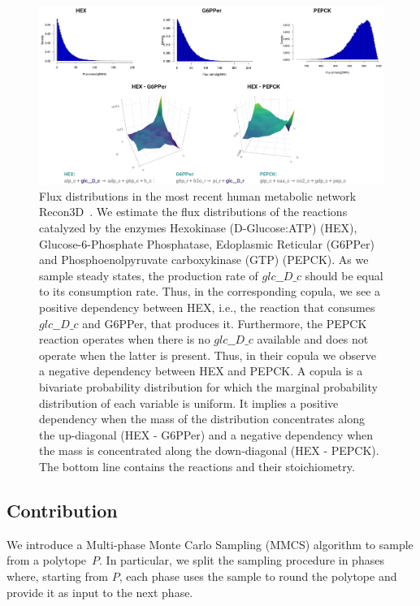    \begin{figure}[h]
      \centering
      \includegraphics[width=125mm]{figures/copulas_cropped.png}
      \caption[Flux distributions in the most recent human metabolic network Recon3D]{
         Flux distributions in the most recent human metabolic network Recon3D~\cite{brunk2018recon3d}. 
         We estimate the flux distributions of the reactions catalyzed by the enzymes Hexokinase (D-Glucose:ATP) (HEX), Glucose-6-Phosphate Phosphatase, Edoplasmic Reticular (G6PPer)
         and Phosphoenolpyruvate carboxykinase (GTP) (PEPCK).
         As we sample steady states, the production rate of $glc\_\_D \_c$ should be equal to its consumption rate. 
         Thus, in the corresponding copula, we see a positive dependency between HEX,
         i.e., the reaction that consumes $glc\_\_D \_c$ and G6PPer, that produces it.
         Furthermore, the PEPCK reaction operates when there is no $glc\_\_D\_c$ available and does not operate when the latter is present.
         Thus, in their copula we observe a negative dependency between HEX and PEPCK.
         A copula is a bivariate probability distribution for which the marginal probability distribution of each variable is uniform.
         It implies a positive dependency when the mass of the distribution concentrates along the up-diagonal (HEX - G6PPer)
         and a negative dependency when the mass is concentrated along the down-diagonal (HEX - PEPCK). %
         The bottom line contains the  reactions and their stoichiometry.
      }
      \label{fig:sampling-on-recond3d}
   \end{figure}


\subsection{Contribution}

   We introduce a Multi-phase Monte Carlo Sampling (MMCS) algorithm
   to sample from a polytope~$P$. 
   In particular, we split the sampling procedure in phases where, starting from $P$,
   each phase uses the sample to round the polytope and provide it as input to the next phase.
   
